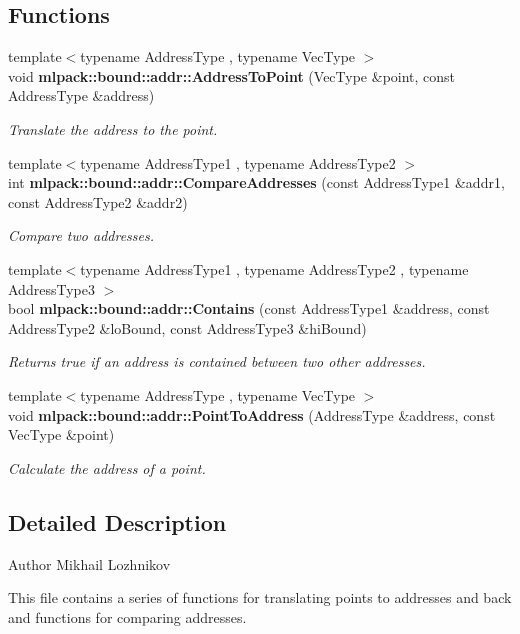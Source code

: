 \subsection*{Functions}
\begin{DoxyCompactItemize}
\item 
{\footnotesize template$<$typename Address\+Type , typename Vec\+Type $>$ }\\void {\bf mlpack\+::bound\+::addr\+::\+Address\+To\+Point} (Vec\+Type \&point, const Address\+Type \&address)
\begin{DoxyCompactList}\small\item\em Translate the address to the point. \end{DoxyCompactList}\item 
{\footnotesize template$<$typename Address\+Type1 , typename Address\+Type2 $>$ }\\int {\bf mlpack\+::bound\+::addr\+::\+Compare\+Addresses} (const Address\+Type1 \&addr1, const Address\+Type2 \&addr2)
\begin{DoxyCompactList}\small\item\em Compare two addresses. \end{DoxyCompactList}\item 
{\footnotesize template$<$typename Address\+Type1 , typename Address\+Type2 , typename Address\+Type3 $>$ }\\bool {\bf mlpack\+::bound\+::addr\+::\+Contains} (const Address\+Type1 \&address, const Address\+Type2 \&lo\+Bound, const Address\+Type3 \&hi\+Bound)
\begin{DoxyCompactList}\small\item\em Returns true if an address is contained between two other addresses. \end{DoxyCompactList}\item 
{\footnotesize template$<$typename Address\+Type , typename Vec\+Type $>$ }\\void {\bf mlpack\+::bound\+::addr\+::\+Point\+To\+Address} (Address\+Type \&address, const Vec\+Type \&point)
\begin{DoxyCompactList}\small\item\em Calculate the address of a point. \end{DoxyCompactList}\end{DoxyCompactItemize}


\subsection{Detailed Description}
\begin{DoxyAuthor}{Author}
Mikhail Lozhnikov
\end{DoxyAuthor}
This file contains a series of functions for translating points to addresses and back and functions for comparing addresses.

